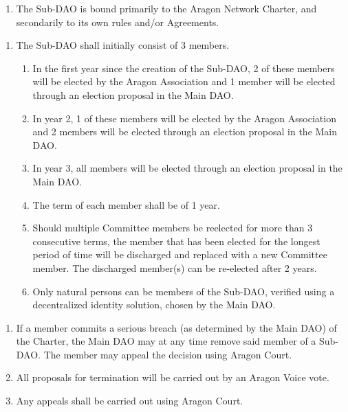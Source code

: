 
\label{chap:SubDAOAgreements}

\begin{enumerate}
	
	\begin{enumerate}
		
		\begin{enumerate}
			\item The Sub-\ac{DAO} is bound primarily to the Aragon Network Charter, and secondarily to its own rules and/or Agreements.
		\end{enumerate}
		
		\begin{enumerate}
			\item The Sub-\ac{DAO} shall initially consist of 3 members.
			\begin{enumerate}
				\item In the first year since the creation of the Sub-\ac{DAO}, 2 of these members will be elected by the Aragon Association and 1 member will be elected through an election proposal in the Main \ac{DAO}.
				\item In year 2, 1 of these members will be elected by the Aragon Association and 2 members will be elected through an election proposal in the Main \ac{DAO}.
				\item In year 3, all members will be elected through an election proposal in the Main \ac{DAO}.
				\item The term of each member shall be of 1 year.
				\item Should multiple Committee members be reelected for more than 3 consecutive terms, the member that has been elected for the longest period of time will be discharged and replaced with a new Committee member.
				The discharged member(s) can be re-elected after 2 years.
				\item Only natural persons can be members of the Sub-\ac{DAO}, verified using a decentralized identity solution, chosen by the Main \ac{DAO}.
			\end{enumerate}
		\end{enumerate}
		
		\begin{enumerate}
			\item If a member commits a serious breach (as determined by the Main \ac{DAO}) of the Charter, the Main \ac{DAO} may at any time remove said member of a Sub-\ac{DAO}.
			The member may appeal the decision using Aragon Court.
			\item All proposals for termination will be carried out by an Aragon Voice vote.
			\item Any appeals shall be carried out using Aragon Court.
		\end{enumerate}
		

\end{enumerate}
\end{enumerate}
